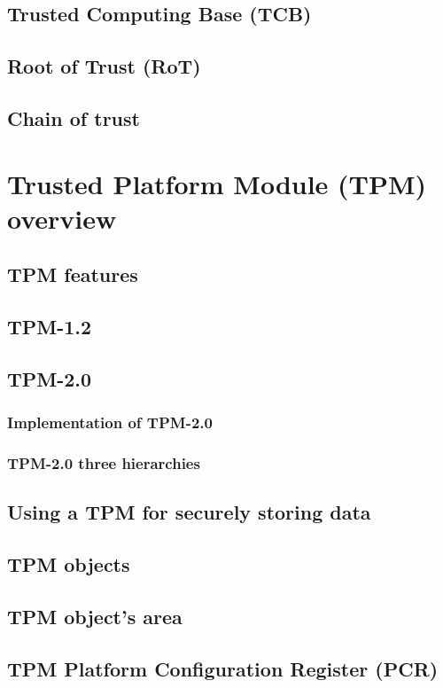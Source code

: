 \subsection{Trusted Computing Base (TCB)}

\subsection{Root of Trust (RoT)}


\subsection{Chain of trust}


\section{Trusted Platform Module (TPM) overview}

\subsection{TPM features}

\subsection{TPM-1.2}

\subsection{TPM-2.0}

\subsubsection{Implementation of TPM-2.0}

\subsubsection{TPM-2.0 three hierarchies}


\subsection{Using a TPM for securely storing data}

\subsection{TPM objects}

\subsection{TPM object's area}

\subsection{TPM Platform Configuration Register (PCR)}